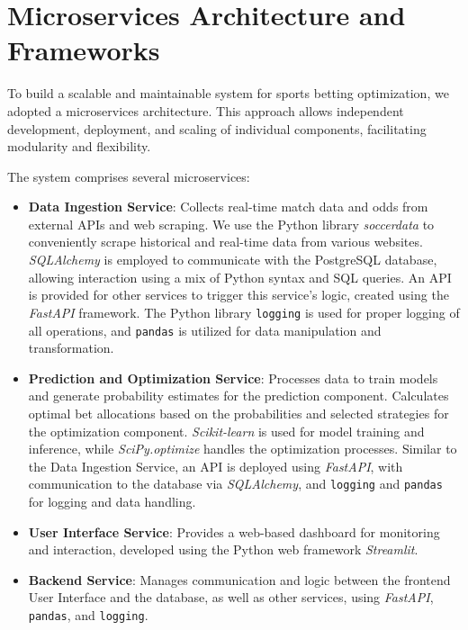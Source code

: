 \section{Microservices Architecture and Frameworks}

To build a scalable and maintainable system for sports betting optimization, we adopted a microservices architecture. This approach allows independent development, deployment, and scaling of individual components, facilitating modularity and flexibility.

The system comprises several microservices:

\begin{itemize}
    \item \textbf{Data Ingestion Service}: Collects real-time match data and odds from external APIs and web scraping. We use the Python library \textit{soccerdata} to conveniently scrape historical and real-time data from various websites. \textit{SQLAlchemy} is employed to communicate with the PostgreSQL database, allowing interaction using a mix of Python syntax and SQL queries. An API is provided for other services to trigger this service's logic, created using the \textit{FastAPI} framework. The Python library \texttt{logging} is used for proper logging of all operations, and \texttt{pandas} is utilized for data manipulation and transformation.

    \item \textbf{Prediction and Optimization Service}: Processes data to train models and generate probability estimates for the prediction component. Calculates optimal bet allocations based on the probabilities and selected strategies for the optimization component. \textit{Scikit-learn} is used for model training and inference, while \textit{SciPy.optimize} handles the optimization processes. Similar to the Data Ingestion Service, an API is deployed using \textit{FastAPI}, with communication to the database via \textit{SQLAlchemy}, and \texttt{logging} and \texttt{pandas} for logging and data handling.

    \item \textbf{User Interface Service}: Provides a web-based dashboard for monitoring and interaction, developed using the Python web framework \textit{Streamlit}.

    \item \textbf{Backend Service}: Manages communication and logic between the frontend User Interface and the database, as well as other services, using \textit{FastAPI}, \texttt{pandas}, and \texttt{logging}.


\end{itemize}
